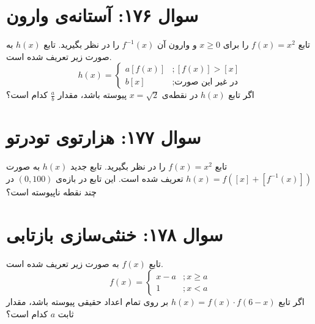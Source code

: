 \documentclass[12pt]{article}
\begin{document}
\vspace{1cm}
\hrulefill
\vspace{1cm}

\section*{سوال ۱۷۶: آستانه‌ی وارون}
تابع \(f(x) = x^2\) را برای \(x \ge 0\) و وارون آن \(f^{-1}(x)\) را در نظر بگیرید. تابع \(h(x)\) به صورت زیر تعریف شده است.
\begin{displaymath}
	h(x) = 
	\begin{cases}
		a[f(x)] & ; [f(x)] > [x] \\
		b[x] & ; \text{در غیر این صورت}
	\end{cases}
\end{displaymath}
اگر تابع \(h(x)\) در نقطه‌ی \(x=\sqrt{2}\) پیوسته باشد، مقدار \( \frac{a}{b} \) کدام است؟

\vspace{1cm}
\hrulefill
\vspace{1cm}

\section*{سوال ۱۷۷: هزارتوی تودرتو}
تابع \(f(x) = x^2\) را در نظر بگیرید. تابع جدید \(h(x)\) به صورت \(h(x) = f\left([x] + \left[f^{-1}(x)\right]\right)\) تعریف شده است. این تابع در بازه‌ی \( (0, 100) \) در چند نقطه ناپیوسته است؟

\vspace{1cm}
\hrulefill
\vspace{1cm}

\section*{سوال ۱۷۸: خنثی‌سازی بازتابی}
تابع \(f(x)\) به صورت زیر تعریف شده است.
\begin{displaymath}
	f(x) = 
	\begin{cases}
		x-a & ; x \ge a \\
		1 & ; x < a
	\end{cases}
\end{displaymath}
اگر تابع \( h(x) = f(x) \cdot f(6-x) \) بر روی تمام اعداد حقیقی پیوسته باشد، مقدار ثابت \(a\) کدام است؟
\end{document}
